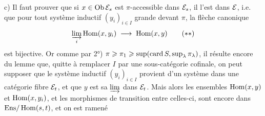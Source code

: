 c) Il faut prouver que si $x \in \operatorname{Ob}\mathcal{E}_s$ est $\pi$-accessible dans $\mathcal{E}_s$, il l'est dans $\mathcal{E}$, i.e. que pour tout système inductif $(y_i)_{i\in I}$ grande devant $\pi$, la flèche canonique
\[
\varinjlim_{i} \Hom(x,y_i) \;\longrightarrow\; \Hom(x,y) \tag*{$(**)$}
\]
est bijective. Or comme par 2°) $\pi \geqslant \pi_1 \geqslant \sup(\operatorname{card} S, \sup_\lambda \pi_\lambda)$, il résulte encore du lemme %
que, quitte à remplacer $I$ par une sous-catégorie cofinale, on peut supposer que le système inductif $(y_i)_{i\in I}$ provient d'un système dans une catégorie fibre $\mathcal{E}_t$, et que $y$ est sa $\varinjlim$ dans $\mathcal{E}_t$. Mais alors les ensembles $\operatorname{Hom}(x,y)$ et $\operatorname{Hom}(x,y_i)$, et les morphismes de transition entre celles-ci, sont encore dans $\mathrm{Ens}/\operatorname{Hom}(s,t)$, et on est ramené
